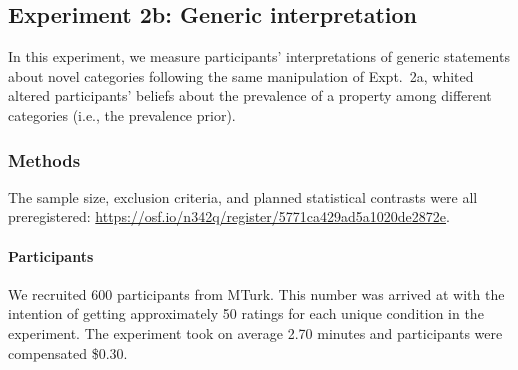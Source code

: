\documentclass[floatsintext,doc]{apa6}
\let\oldparagraph\paragraph
\renewcommand{\paragraph}[1]{\oldparagraph{#1}\mbox{}}
\let\rmarkdownfootnote\footnote%
\def\footnote{\protect\rmarkdownfootnote}
\begin{document}
\hypertarget{experiment-2b-generic-interpretation}{%
\subsection{Experiment 2b: Generic interpretation}\label{experiment-2b-generic-interpretation}}

In this experiment, we measure participants' interpretations of generic statements about novel categories following the same manipulation of Expt.~2a, whited altered participants' beliefs about the prevalence of a property among different categories (i.e., the prevalence prior). 



\hypertarget{methods-3}{%
\subsubsection{Methods}\label{methods-3}}

The sample size, exclusion criteria, and planned statistical contrasts were all preregistered: \url{https://osf.io/n342q/register/5771ca429ad5a1020de2872e}.

\hypertarget{participants-4}{%
\paragraph{Participants}\label{participants-4}}
%
We recruited 600 participants from MTurk.
This number was arrived at with the intention of getting approximately 50 ratings for each unique condition in the experiment.
The experiment took on average 2.70 minutes and participants were compensated \$0.30.
\end{document}
